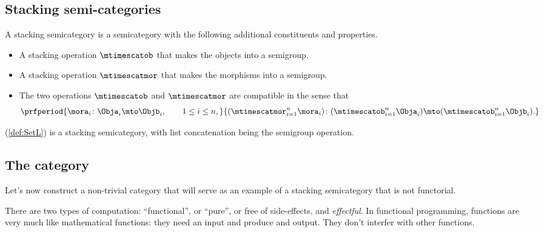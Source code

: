 \subsection{Stacking semi-categories}

\begin{ctdefinition}
    \label{def:stacking-semi-cat}
    A stacking semicategory is a semicategory with the following additional constituents and properties.

    \constit
    \begin{itemize}
        \item A stacking operation $\mtimescatob$ that makes the objects into a semigroup.
        \item A stacking operation $\mtimescatmor$ that makes the morphisms into a semigroup.
    \end{itemize}

    \condit
    \begin{itemize}
        \item The two operations $\mtimescatob$ and $\mtimescatmor$ are compatible in the sense that
              \begin{equation}
                  \prfperiod{
                      \mora_i \colon \Obja_i \mto \Objb_i, \qquad 1 \leq i \leq n,
                  }{
                      ( \mtimescatmor_{i=1}^n \mora_i )\colon( \mtimescatob_{i=1}^n \Obja_i) \mto (\mtimescatob_{i=1}^n \Objb_i).
                  }
              \end{equation}
    \end{itemize}
\end{ctdefinition}

\begin{example}
    \SetL (\cref{def:SetL}) is a stacking semicategory,
    with list concatenation being the semigroup operation.
\end{example}

\subsection{The \Effects category}

Let's now construct a non-trivial category that will serve as an example of a stacking semicategory that is not functorial.

There are two types of computation: ``functional'', or ``pure'', or free of side-effects, and \emph{effectful}.
In functional programming, functions are very much like mathematical functions: they need an input and produce and output.
They don't interfer with other functions.

